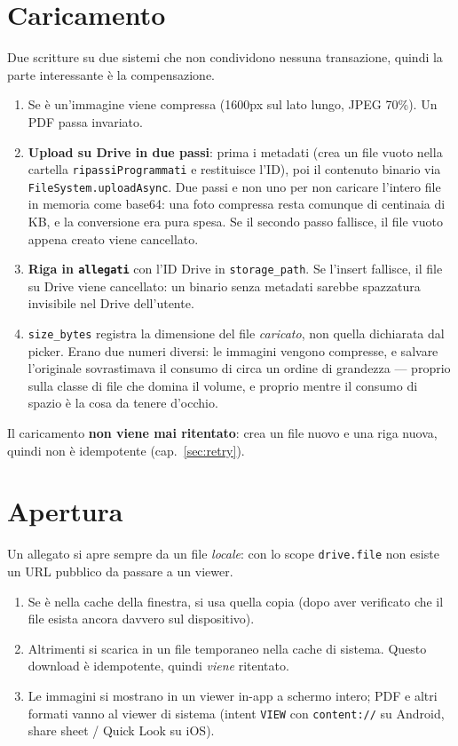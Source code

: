 \documentclass[11pt,a4paper]{report}
\begin{document}
\section{Caricamento}

Due scritture su due sistemi che non condividono nessuna transazione, quindi
la parte interessante \`e la compensazione.

\begin{enumerate}[nosep]
  \item Se \`e un'immagine viene compressa (1600px sul lato lungo, JPEG 70\%).
        Un PDF passa invariato.
  \item \textbf{Upload su Drive in due passi}: prima i metadati (crea un file
        vuoto nella cartella \texttt{ripassiProgrammati} e restituisce l'ID),
        poi il contenuto binario via \texttt{FileSystem.uploadAsync}. Due passi
        e non uno per non caricare l'intero file in memoria come base64: una
        foto compressa resta comunque di centinaia di KB, e la conversione era
        pura spesa. Se il secondo passo fallisce, il file vuoto appena creato
        viene cancellato.
  \item \textbf{Riga in \texttt{allegati}} con l'ID Drive in
        \texttt{storage\_path}. Se l'insert fallisce, il file su Drive viene
        cancellato: un binario senza metadati sarebbe spazzatura invisibile
        nel Drive dell'utente.
  \item \texttt{size\_bytes} registra la dimensione del file \emph{caricato},
        non quella dichiarata dal picker. Erano due numeri diversi: le immagini
        vengono compresse, e salvare l'originale sovrastimava il consumo di
        circa un ordine di grandezza --- proprio sulla classe di file che
        domina il volume, e proprio mentre il consumo di spazio \`e la cosa da
        tenere d'occhio.
\end{enumerate}

Il caricamento \textbf{non viene mai ritentato}: crea un file nuovo e una riga
nuova, quindi non \`e idempotente (cap.~\ref{sec:retry}).

\section{Apertura}

Un allegato si apre sempre da un file \emph{locale}: con lo scope
\texttt{drive.file} non esiste un URL pubblico da passare a un viewer.

\begin{enumerate}[nosep]
  \item Se \`e nella cache della finestra, si usa quella copia (dopo aver
        verificato che il file esista ancora davvero sul dispositivo).
  \item Altrimenti si scarica in un file temporaneo nella cache di sistema.
        Questo download \`e idempotente, quindi \emph{viene} ritentato.
  \item Le immagini si mostrano in un viewer in-app a schermo intero; PDF e
        altri formati vanno al viewer di sistema (intent \texttt{VIEW} con
        \texttt{content://} su Android, share sheet / Quick Look su iOS).
\end{enumerate}
\end{document}
